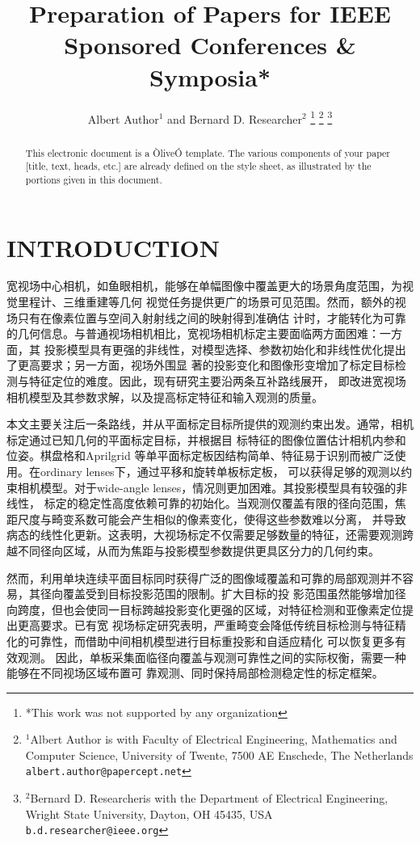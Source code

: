 \documentclass[letterpaper, 10 pt, conference]{ieeeconf}  %
\title{\LARGE \bf
Preparation of Papers for IEEE Sponsored Conferences \& Symposia*
}
\author{Albert Author$^{1}$ and Bernard D. Researcher$^{2}$%
\thanks{*This work was not supported by any organization}%
\thanks{$^{1}$Albert Author is with Faculty of Electrical Engineering, Mathematics and Computer Science,
        University of Twente, 7500 AE Enschede, The Netherlands
        {\tt\small albert.author@papercept.net}}%
\thanks{$^{2}$Bernard D. Researcheris with the Department of Electrical Engineering, Wright State University,
        Dayton, OH 45435, USA
        {\tt\small b.d.researcher@ieee.org}}%
}
\begin{document}
\maketitle
\thispagestyle{empty}
\pagestyle{empty}


\begin{abstract}

This electronic document is a ÒliveÓ template. The various components of your paper [title, text, heads, etc.] are already defined on the style sheet, as illustrated by the portions given in this document.

\end{abstract}


\section{INTRODUCTION}

宽视场中心相机，如鱼眼相机，能够在单幅图像中覆盖更大的场景角度范围，为视觉里程计、三维重建等几何
视觉任务提供更广的场景可见范围。然而，额外的视场只有在像素位置与空间入射射线之间的映射得到准确估
计时，才能转化为可靠的几何信息。与普通视场相机相比，宽视场相机标定主要面临两方面困难：一方面，其
投影模型具有更强的非线性，对模型选择、参数初始化和非线性优化提出了更高要求；另一方面，视场外围显
著的投影变化和图像形变增加了标定目标检测与特征定位的难度。因此，现有研究主要沿两条互补路线展开，
即改进宽视场相机模型及其参数求解，以及提高标定特征和输入观测的质量。

本文主要关注后一条路线，并从平面标定目标所提供的观测约束出发。通常，相机标定通过已知几何的平面标定目标，并根据目
标特征的图像位置估计相机内参和位姿。棋盘格和Aprilgrid
等单平面标定板因结构简单、特征易于识别而被广泛使用。在ordinary lenses下，通过平移和旋转单板标定板，
可以获得足够的观测以约束相机模型。对于wide-angle lenses，情况则更加困难。其投影模型具有较强的非线性，
标定的稳定性高度依赖可靠的初始化。当观测仅覆盖有限的径向范围，焦距尺度与畸变系数可能会产生相似的像素变化，使得这些参数难以分离，
并导致病态的线性化更新。这表明，大视场标定不仅需要足够数量的特征，还需要观测跨越不同径向区域，从而为焦距与投影模型参数提供更具区分力的几何约束。

然而，利用单块连续平面目标同时获得广泛的图像域覆盖和可靠的局部观测并不容易，其径向覆盖受到目标投影范围的限制。扩大目标的投
影范围虽然能够增加径向跨度，但也会使同一目标跨越投影变化更强的区域，对特征检测和亚像素定位提出更高要求。已有宽
视场标定研究表明，严重畸变会降低传统目标检测与特征精化的可靠性，而借助中间相机模型进行目标重投影和自适应精化
可以恢复更多有效观测。 因此，单板采集面临径向覆盖与观测可靠性之间的实际权衡，需要一种能够在不同视场区域布置可
靠观测、同时保持局部检测稳定性的标定框架。
\end{document}

